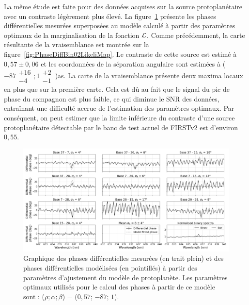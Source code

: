 La même étude est faite pour des données acquises sur la source protoplanétaire avec un contraste légèrement plus élevé. La figure~\ref{fig:PhaseDiffBin02LikeliFit} présente les phases différentielles mesurées superposées au modèle calculé à partir des paramètres optimaux de la marginalisation de la fonction $\mathcal{L}$. Comme précédemment, la carte résultante de la vraisemblance est montrée sur la figure~\ref{fig:PhaseDiffBin02LikeliMap}. Le contraste de cette source est estimé à $0,57 \pm 0,06$ et les coordonnées de la séparation angulaire sont estimées à ($-87\substack{+16 \\ -4}; 1\substack{+2 \\ -1} \,$)as. La carte de la vraisemblance présente deux maxima locaux en plus que sur la première carte. Cela est dû au fait que le signal du pic de phase du compagnon est plus faible, ce qui diminue le \ac{SNR} des données, entraînant une difficulté accrue de l'estimation des paramètres optimaux. Par conséquent, on peut estimer que la limite inférieure du contraste d'une source protoplanétaire détectable par le banc de test actuel de \ac{FIRSTv2} est d'environ $0,55$.

\begin{figure}[ht!]
    \centering
    \includegraphics[width=\figwidth]{Figure_Chap4/20221010_Bin02_SpeDiffPhase_Calp2vm_FitLikeli_BaseSubplot_Pola1_LaTex.png}
    \caption[Graphique des phases différentielles mesurées et des phases différentielles modélisées à partir des paramètres d'ajustement du modèle de système protoplanétaire.]{Graphique des phases différentielles mesurées (en trait plein) et des phases différentielles modélisées (en pointillés) à partir des paramètres d'ajustement du modèle de protoplanète. Les paramètres optimaux utilisés pour le calcul des phases à partir de ce modèle sont : ($\rho; \alpha; \beta$) = ($0,57$; $-87$; $1$).}
    \label{fig:PhaseDiffBin02LikeliFit}
\end{figure}

